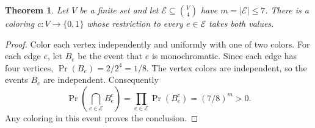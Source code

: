 \documentclass{article}
\newtheorem{theorem}{Theorem}
\begin{document}
\begin{theorem}\label{thm:target}
Let $V$ be a finite set and let $\mathcal E\subseteq\binom V4$ have
$m=|\mathcal E|\le 7$. There is a coloring $c:V\to\{0,1\}$ whose
restriction to every $e\in\mathcal E$ takes both values.
\end{theorem}
\begin{proof}
Color each vertex independently and uniformly with one of two colors.
For each edge $e$, let $B_e$ be the event that $e$ is monochromatic.
Since each edge has four vertices, $\Pr(B_e)=2/2^4=1/8$.
The vertex colors are independent, so the events $B_e$ are independent.
Consequently
\[
 \Pr\!\left(\bigcap_{e\in\mathcal E}B_e^c\right)
 =\prod_{e\in\mathcal E}\Pr(B_e^c)=(7/8)^m>0.
\]
Any coloring in this event proves the conclusion.
\end{proof}
\end{document}
